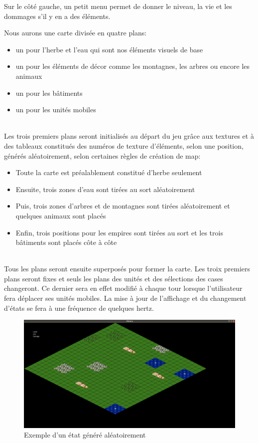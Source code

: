 \documentclass[12pt,a4paper]{article}
\begin{document}
Sur le côté gauche, un petit menu permet de donner le niveau, la vie et les dommages s'il y en a des éléments.

Nous aurons une carte divisée en quatre plans: 
\begin{itemize}
\item un pour l'herbe et l'eau qui sont nos éléments visuels de base
\item un pour les éléments de décor comme les montagnes, les arbres ou encore les animaux
\item un pour les bâtiments
\item un pour les unités mobiles
\end{itemize}\\

Les trois premiers plans seront initialisés au départ du jeu grâce aux textures et à des tableaux constitués des numéros de texture d'éléments, selon une position, générés aléatoirement, selon certaines règles de création de map:
\begin{itemize}
\item Toute la carte est préalablement constitué d'herbe seulement
\item Ensuite, trois zones d'eau sont tirées au sort aléatoirement
\item Puis, trois zones d'arbres et de montagnes sont tirées  aléatoirement et quelques animaux sont placés
\item Enfin, trois positions pour les empires sont tirées au sort et les trois bâtiments sont placés côte à côte
\end{itemize}\\

Tous les plans seront ensuite superposés pour former la carte. Les troix premiers plans seront fixes et seuls les plans des unités et des sélections des cases changeront. Ce dernier sera en effet modifié à chaque tour lorsque l'utilisateur fera déplacer ses unités mobiles. La mise à jour de l'affichage et du changement d'états se fera à une fréquence de quelques hertz.

\newpage

\begin{figure}[!ht]
\centering
    \includegraphics[width=1\textwidth]{ressources/MapAlea.png}
     \caption{Exemple d'un état généré aléatoirement}
\end{figure}
\end{document}
